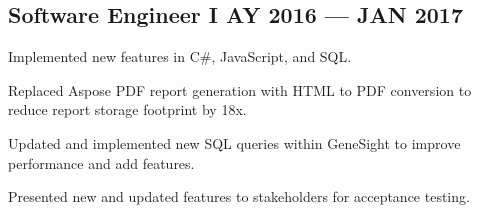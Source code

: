 \subsection{{Software Engineer I \texorpdfstring{\hfill} \texorpdfstring{\null} MAY 2016 --- JAN 2017}}
\begin{zitemize}
\item Implemented new features in C\#, JavaScript, and SQL.
\item Replaced Aspose PDF report generation with HTML to PDF conversion to reduce report storage footprint by 18x.
\item Updated and implemented new SQL queries within GeneSight to improve performance and add features.
\item Presented new and updated features to stakeholders for acceptance testing.
\end{zitemize}
